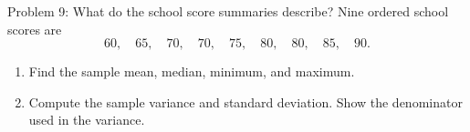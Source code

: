 \documentclass[notes,10pt, aspectratio=169]{beamer}
\newif\ifshowsolutions
\newcommand{\answerpart}[1]{\textcolor{blue}{\textbf{#1.}}\,}
\begin{document}
\begin{frame}{Problem 9: What do the school score summaries describe?}
Nine ordered school scores are
\[
60,\quad65,\quad70,\quad70,\quad75,\quad80,\quad80,\quad85,\quad90.
\]
\begin{enumerate}
\setlength{\itemsep}{8pt}
\item Find the sample mean, median, minimum, and maximum.
\item Compute the sample variance and standard deviation. Show the denominator used in the variance.
\end{enumerate}
\end{frame}

\ifshowsolutions
\begin{frame}{Solution 9: Mean, median, and range}
\small
\answerpart{1}The sample mean is
\[
\overline y=\frac1n\sum_{i=1}^n y_i=\frac{675}{9}=75\text{ points}.
\]
The median is the fifth ordered score, 75. The minimum is 60 and the maximum is 90.
\end{frame}

\begin{frame}{Solution 9: Variance and standard deviation (continued)}
\small
\answerpart{2}The sample variance uses the divisor $n-1$:
\[
\begin{aligned}
\sum_{i=1}^9(y_i-\overline y)^2
&=225+100+25+25+0+25+25+100+225=750,\\
s_y^2&=\frac{\sum_{i=1}^n(y_i-\overline y)^2}{n-1}
=\frac{750}{8}=93.75\text{ points}^2,\\
s_y&=\sqrt{s_y^2}=\sqrt{93.75}\approx9.682\text{ points}.
\end{aligned}
\]
\end{frame}
\fi
\end{document}
